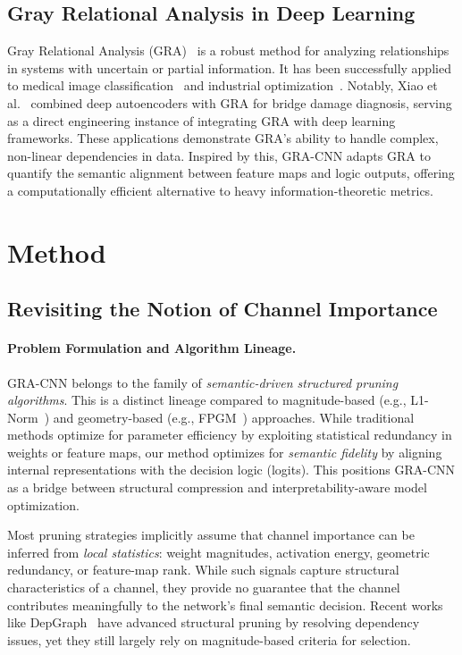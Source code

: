 \documentclass[sn-mathphys,Numbered]{sn-jnl}
\begin{document}
\subsection{Gray Relational Analysis in Deep Learning}
Gray Relational Analysis (GRA)~\cite{deng1989gra} is a robust method for analyzing relationships in systems with uncertain or partial information. It has been successfully applied to medical image classification~\cite{pal2021improved} and industrial optimization~\cite{wang2024integration,hamdi2023application}. Notably, Xiao et al.~\cite{xiao2021novel} combined deep autoencoders with GRA for bridge damage diagnosis, serving as a direct engineering instance of integrating GRA with deep learning frameworks. These applications demonstrate GRA's ability to handle complex, non-linear dependencies in data. Inspired by this, GRA-CNN adapts GRA to quantify the semantic alignment between feature maps and logic outputs, offering a computationally efficient alternative to heavy information-theoretic metrics.

\section{Method}
\label{sec:method}

\subsection{Revisiting the Notion of Channel Importance}

\paragraph{Problem Formulation and Algorithm Lineage.}
GRA-CNN belongs to the family of \emph{semantic-driven structured pruning algorithms}. This is a distinct lineage compared to magnitude-based (e.g., L1-Norm~\cite{he2017channel}) and geometry-based (e.g., FPGM~\cite{he2019fpgm}) approaches. While traditional methods optimize for parameter efficiency by exploiting statistical redundancy in weights or feature maps, our method optimizes for \emph{semantic fidelity} by aligning internal representations with the decision logic (logits). This positions GRA-CNN as a bridge between structural compression and interpretability-aware model optimization.

Most pruning strategies implicitly assume that channel importance can be inferred from \emph{local statistics}: weight magnitudes, activation energy, geometric redundancy, or feature-map rank. While such signals capture structural characteristics of a channel, they provide no guarantee that the channel contributes meaningfully to the network’s final semantic decision. Recent works like DepGraph~\cite{fang2023depgraph} have advanced structural pruning by resolving dependency issues, yet they still largely rely on magnitude-based criteria for selection.
\end{document}
